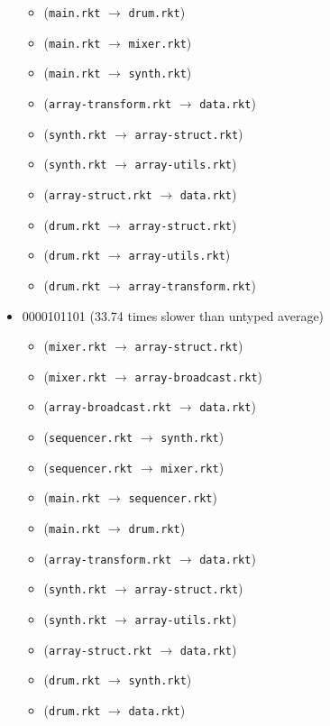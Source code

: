 \documentclass{article}
\newcommand{\mono}[1]{\texttt{#1}}
\begin{document}
\begin{itemize}
\begin{itemize}
  \item (\mono{main.rkt} $\rightarrow$ \mono{drum.rkt})
  \item (\mono{main.rkt} $\rightarrow$ \mono{mixer.rkt})
  \item (\mono{main.rkt} $\rightarrow$ \mono{synth.rkt})
  \item (\mono{array-transform.rkt} $\rightarrow$ \mono{data.rkt})
  \item (\mono{synth.rkt} $\rightarrow$ \mono{array-struct.rkt})
  \item (\mono{synth.rkt} $\rightarrow$ \mono{array-utils.rkt})
  \item (\mono{array-struct.rkt} $\rightarrow$ \mono{data.rkt})
  \item (\mono{drum.rkt} $\rightarrow$ \mono{array-struct.rkt})
  \item (\mono{drum.rkt} $\rightarrow$ \mono{array-utils.rkt})
  \item (\mono{drum.rkt} $\rightarrow$ \mono{array-transform.rkt})
  \end{itemize}
\item 0000101101 (33.74 times slower than untyped average)
  \begin{itemize}
  \item (\mono{mixer.rkt} $\rightarrow$ \mono{array-struct.rkt})
  \item (\mono{mixer.rkt} $\rightarrow$ \mono{array-broadcast.rkt})
  \item (\mono{array-broadcast.rkt} $\rightarrow$ \mono{data.rkt})
  \item (\mono{sequencer.rkt} $\rightarrow$ \mono{synth.rkt})
  \item (\mono{sequencer.rkt} $\rightarrow$ \mono{mixer.rkt})
  \item (\mono{main.rkt} $\rightarrow$ \mono{sequencer.rkt})
  \item (\mono{main.rkt} $\rightarrow$ \mono{drum.rkt})
  \item (\mono{array-transform.rkt} $\rightarrow$ \mono{data.rkt})
  \item (\mono{synth.rkt} $\rightarrow$ \mono{array-struct.rkt})
  \item (\mono{synth.rkt} $\rightarrow$ \mono{array-utils.rkt})
  \item (\mono{array-struct.rkt} $\rightarrow$ \mono{data.rkt})
  \item (\mono{drum.rkt} $\rightarrow$ \mono{synth.rkt})
  \item (\mono{drum.rkt} $\rightarrow$ \mono{data.rkt})
  \end{itemize}

\end{itemize}
\end{document}
